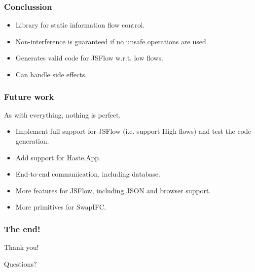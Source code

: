 \documentclass{beamer}
\begin{document}

\begin{frame}
  \frametitle{Conclussion}
  \begin{itemize}
    \item Library for static information flow control. \pause
    \item Non-interference is guaranteed if no unsafe operations are used. \pause
    \item Generates valid code for JSFlow w.r.t. low flows. \pause
    \item Can handle side effects.
  \end{itemize}
\end{frame}


\begin{frame}
  \frametitle{Future work}
  As with everything, nothing is perfect. \pause
  \begin{itemize}
    \item Implement full support for JSFlow (i.e. support High flows) and test the code generation. \pause
    \item Add support for Haste.App. \pause
    \item End-to-end communication, including database. \pause
    \item More features for JSFlow, including JSON and browser support. \pause
    \item More primitives for SwapIFC.
  \end{itemize}
\end{frame}


\begin{frame}
  \frametitle{The end!}
  \Huge
  \begin{center}
    Thank you!
  \end{center}
  \begin{center}
    Questions?
  \end{center}
\end{frame}

\end{document}
